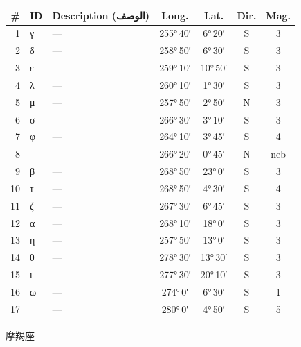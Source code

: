 \documentclass[9pt,a4paper]{extarticle}
\newcommand{\ar}[1]{{\arabicfont\textarabic{#1}}}
\begin{document}
\begin{longtable}{r l >{\raggedright\arraybackslash}p{6.7cm} c c c c}
\toprule \# & ID & Description (\ar{الوصف}) & Long. & Lat. & Dir. & Mag.\\ \midrule\endhead
1 & γ & \textcolor{gray}{—} & 255°\,40′ & 6°\,20′ & S & 3\\
2 & δ & \textcolor{gray}{—} & 258°\,50′ & 6°\,30′ & S & 3\\
3 & ε & \textcolor{gray}{—} & 259°\,10′ & 10°\,50′ & S & 3\\
4 & λ & \textcolor{gray}{—} & 260°\,10′ & 1°\,30′ & S & 3\\
5 & μ & \textcolor{gray}{—} & 257°\,50′ & 2°\,50′ & N & 3\\
6 & σ & \textcolor{gray}{—} & 266°\,30′ & 3°\,10′ & S & 3\\
7 & φ & \textcolor{gray}{—} & 264°\,10′ & 3°\,45′ & S & 4\\
8 &  & \textcolor{gray}{—} & 266°\,20′ & 0°\,45′ & N & neb\\
9 & β & \textcolor{gray}{—} & 268°\,50′ & 23°\,0′ & S & 3\\
10 & τ & \textcolor{gray}{—} & 268°\,50′ & 4°\,30′ & S & 4\\
11 & ζ & \textcolor{gray}{—} & 267°\,30′ & 6°\,45′ & S & 3\\
12 & α & \textcolor{gray}{—} & 268°\,10′ & 18°\,0′ & S & 3\\
13 & η & \textcolor{gray}{—} & 257°\,50′ & 13°\,0′ & S & 3\\
14 & θ & \textcolor{gray}{—} & 278°\,30′ & 13°\,30′ & S & 3\\
15 & ι & \textcolor{gray}{—} & 277°\,30′ & 20°\,10′ & S & 3\\
16 & ω & \textcolor{gray}{—} & 274°\,0′ & 6°\,30′ & S & 1\\
17 &  & \textcolor{gray}{—} & 280°\,0′ & 4°\,50′ & S & 5\\
\bottomrule\end{longtable}
\vspace{4pt}\quad\ar{الجدي}\quad 摩羯座
\end{document}
